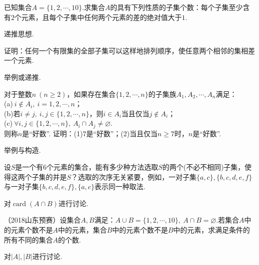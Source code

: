 \documentclass[lang=cn, zihao=4.5]{elegantbook}
\DeclareMathOperator{\card}{card}
\begin{document}
\begin{example} %
	已知集合$A = \{ 1,2, \cdots ,10 \}$.求集合$A$的具有下列性质的子集个数：每个子集至少含有$2$个元素，且每个子集中任何两个元素的差的绝对值大于$1$.
\end{example}
\begin{hint}
	递推思想.
\end{hint}

\begin{example} %
	证明：任何一个有限集的全部子集可以这样地排列顺序，使任意两个相邻的集相差一个元素.
\end{example}
\begin{hint}
	举例或递推.
\end{hint}

\begin{example} %
	对于整数$n~(n \geq 2)$，如果存在集合$\{ 1,2, \cdots ,n \}$的子集族$A_1,A_2, \cdots ,A_n$满足： \\
	(a)$~i \notin A_i,~i=1,2,\cdots ,n$； \\
	(b)若$i \neq j,~ i,j \in \{ 1,2, \cdots ,n \}$，则$i \in A_i$当且仅当$j \notin A_i$； \\
	(c)$~\forall i,j \in \{ 1,2,\cdots ,n \},~ A_i \cap A_j \neq \varnothing$. \\
	则称$n$是“好数”. 证明：(1)$7$是“好数”；(2)当且仅当$n \geq 7$时，$n$是“好数”.
\end{example}
\begin{hint}
	举例与构造.
\end{hint}

\begin{example} %
	设$S$是一个有$6$个元素的集合，能有多少种方法选取$S$的两个(不必不相同)子集，使得这两个子集的并是$S$？选取的次序无关紧要，例如，一对子集$\{ a,c \},\{ b,c,d,e,f \}$与一对子集$\{ b,c,d,e,f \},\{ a,c \}$表示同一种取法.
\end{example}
\begin{hint}
	对$\card{(A \cap B)}$进行讨论.
\end{hint}

\begin{example} %
	（2018山东预赛）设集合$A,B$满足：$A \cup B = \{ 1,2,\cdots ,10 \}, ~A \cap B = \varnothing$.若集合$A$中的元素个数不是$A$中的元素，集合$B$中的元素个数不是$B$中的元素，求满足条件的所有不同的集合$A$的个数.
\end{example}
\begin{hint}
	对$|A|,|B|$进行讨论.
\end{hint}
\end{document}
